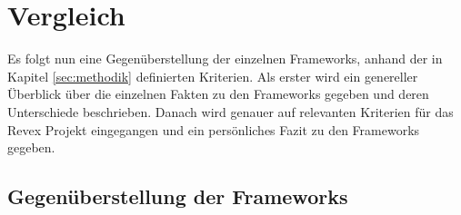 \chapter{Vergleich}
\label{sec:comparison}
Es folgt nun eine Gegenüberstellung der einzelnen Frameworks, anhand der in Kapitel \ref{sec:methodik} definierten Kriterien. Als erster wird ein genereller Überblick über die einzelnen Fakten zu den Frameworks gegeben und deren Unterschiede beschrieben. Danach wird genauer auf relevanten Kriterien für das Revex Projekt eingegangen und ein persönliches Fazit zu den Frameworks gegeben.

\section{Gegenüberstellung der Frameworks}

